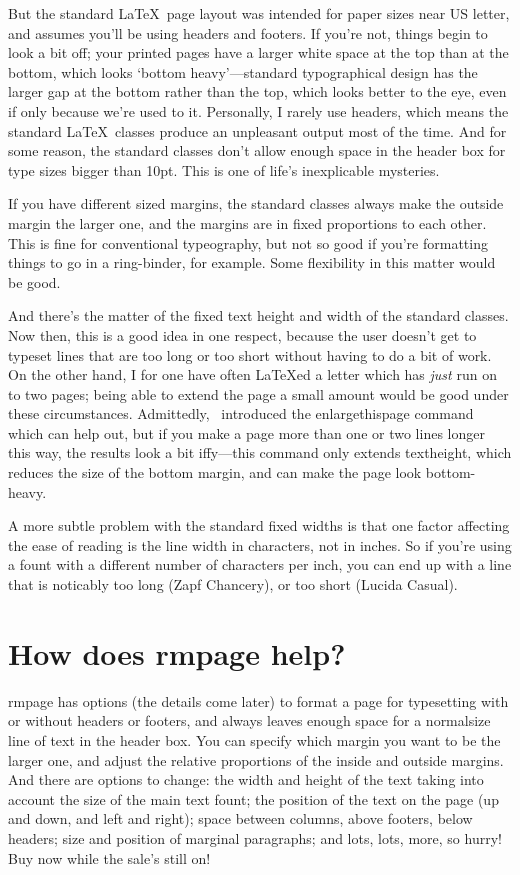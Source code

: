 \documentclass[11pt,loose,twoside,touchwider,longish,
                      noheaders,a4paper,notstdmargins]{report}
\DeclareRobustCommand*{\comname}[1]{{\ttfamily\makeatletter\bs #1\makeatother}}
\newcommand*{\classname}[1]{{\ttfamily #1}}
\newcommand*{\rmpage}{\classname{rmpage}\xspace}
\begin{document}
But the standard \LaTeX\ page layout was intended for paper sizes near
US letter, and assumes you'll be using headers and footers.  If
you're not, things begin to look a bit off; your printed
pages have a larger white space at the top than at the bottom, which
looks `bottom heavy'---standard typographical design has the larger
gap at the bottom rather than the top, which looks better to the eye,
even if only because we're used to it.  Personally, I rarely use
headers, which means the standard \LaTeX\ classes produce an
unpleasant output most of the time.  And for some reason, the standard
classes don't allow enough space in the header box for type sizes
bigger than 10pt.  This is one of life's inexplicable mysteries.

If you have different sized margins, the standard classes always make
the outside margin the larger one, and the margins are in fixed
proportions to each other.  This is fine for conventional typeography,
but not so good if you're formatting things to go in a ring-binder,
for example.  Some flexibility in this matter would be good.

And there's the matter of the fixed text height and width of the
standard classes.  Now then, this is a good idea in one respect,
because the user doesn't get to typeset lines that are too long or too
short without having to do a bit of work.  On the other hand, I for
one have often \LaTeX ed a letter which has \emph{just} run on to two
pages; being able to extend the page a small amount would be good
under these circumstances.  Admittedly, \LaTeXe\ introduced the
\comname{enlargethispage} command which can help out, but if you make
a page more than one or two lines longer this way, the results look a
bit iffy---this command only extends \comname{textheight}, which
reduces the size of the bottom margin, and can make the page look
bottom-heavy.

A more subtle problem with the standard fixed widths is that one
factor affecting the ease of reading is the line width in characters,
not in inches.  So if you're using a fount with a different number of
characters per inch, you can end up with a line that is noticably too
long (Zapf Chancery), or too short (Lucida Casual).

\section{How does \rmpage help?}

\rmpage has options (the details come later) to format a page for
typesetting with or without headers or footers, and always leaves
enough space for a \comname{normalsize} line of text in the header
box.  You can specify which margin you want to be the larger one, and
adjust the relative proportions of the inside and outside margins.
And there are options to change: the width and height of the text
taking into account the size of the main text fount; the position of
the text on the page (up and down, and left and right); space between
columns, above footers, below headers; size and position of marginal
paragraphs; and lots, lots, more, so hurry!  Buy now while the sale's
still on!
\end{document}
